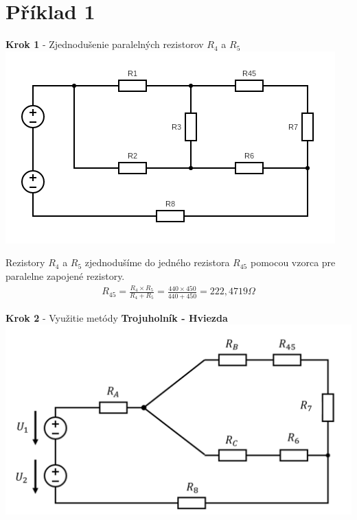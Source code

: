 \section{Příklad 1}

\begin{center}
	\textbf{Krok 1} - Zjednodušenie paralelných rezistorov $R_4$ a $R_5$
	\includegraphics[scale=0.6,keepaspectratio]{fig/c1.png} \\
\end{center}

\noindent Rezistory $R_4$ a  $R_5$ zjednodušíme do jedného rezistora $R_{45}$ pomocou vzorca pre paralelne zapojené rezistory. \\

\begin{gather*}
	R_{45} = \frac{R_4 \times R_5}{R_4 + R_5} = \frac{440 \times 450}{440 + 450} = 222,4719 \Omega
\end{gather*}

\newpage

\begin{center}
\textbf{Krok 2} - Využitie metódy \textbf{Trojuholník - Hviezda}
\includegraphics[scale=0.6,keepaspectratio]{fig/c2.png} \\
\end{center}

